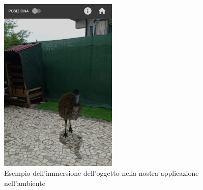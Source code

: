 \documentclass[crop=false, class=book]{standalone}
\begin{document}
	\begin{center}
		\begin{figure}[htp]
		\centering
		\includegraphics[width=0.5\textwidth]{./resources/images/EnvironmentalUnderstanding/env_understanding1.jpeg} 
		\caption{Esempio dell'immersione dell'oggetto nella nostra 	applicazione nell'ambiente}
	\end{figure}
	
	\end{center}
\end{document}

